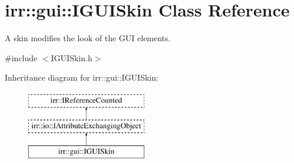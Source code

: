 \hypertarget{classirr_1_1gui_1_1IGUISkin}{}\section{irr\+:\+:gui\+:\+:I\+G\+U\+I\+Skin Class Reference}
\label{classirr_1_1gui_1_1IGUISkin}


A skin modifies the look of the G\+UI elements.  




{\ttfamily \#include $<$I\+G\+U\+I\+Skin.\+h$>$}

Inheritance diagram for irr\+:\+:gui\+:\+:I\+G\+U\+I\+Skin\+:\begin{figure}[H]
\begin{center}
\leavevmode
\includegraphics[height=3.000000cm]{classirr_1_1gui_1_1IGUISkin}
\end{center}
\end{figure}
